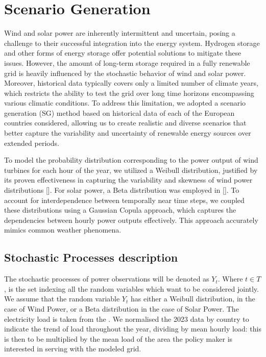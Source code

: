 \documentclass[english]{article}
\numberwithin{definition}{section}
\numberwithin{theorem}{section}
\numberwithin{problem}{section}
\begin{document}
\section{Scenario Generation}

Wind and solar power are inherently intermittent and uncertain, posing a challenge to their successful
 integration into the energy system. Hydrogen storage and other forms of energy storage offer potential 
 solutions to mitigate these issues. However, the amount of long-term storage required in a fully renewable
  grid is heavily influenced by the stochastic behavior of wind and solar power. Moreover, historical data 
  typically covers only a limited number of climate years, which restricts the ability to test the grid over
   long time horizons encompassing various climatic conditions. To address this limitation, we adopted a 
   scenario generation (SG) method based on historical data of each of the European countries considered,
    allowing us to create realistic and diverse scenarios that better capture the variability and uncertainty
     of renewable energy sources over extended periods. 

To model the probability distribution corresponding to the power output of wind turbines for each hour of the
 year, we utilized a Weibull distribution, justified by its proven effectiveness in capturing the variability
  and skewness of wind power distributions [\cite{weibullwind}]. For solar power, a Beta distribution was 
  employed in [\cite{betaPV}]. To account for interdependence between temporally near time steps, we coupled these
   distributions using a Gaussian Copula approach, which captures the dependencies between hourly power
    outputs effectively. This approach accurately mimics common weather phenomena. \\

\subsection{Stochastic Processes description}
The stochastic processes of power observations will be denoted as \(Y_t\). Where \(t \in T\), is the set indexing all the random variables which want to be considered jointly.
We assume that the random variable \(Y_t\) has either a Weibull distribution, in the case of Wind Power, or a Beta distribution in the case of Solar Power. 
The electricity load is taken from the \cite{ENTSOE_PowerStats}. We normalised the 2023 data by country to indicate the trend of load throughout the year, dividing by mean hourly load: this is then to be multiplied by the mean load of the area the policy maker is interested in serving with the modeled grid.
\end{document}
